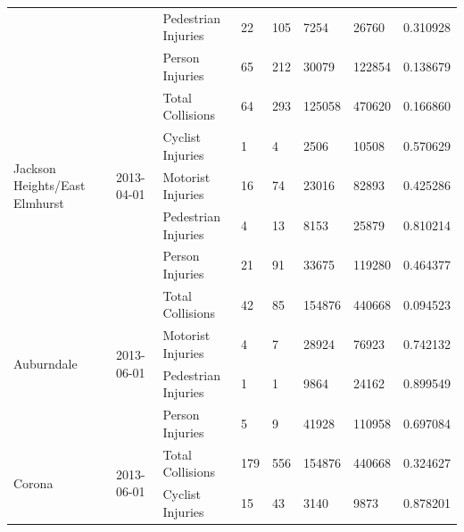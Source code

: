 \documentclass[10pt,journal,compsoc]{IEEEtran}
\begin{document}
\begin{table}[]
\begin{tabular}{|l|l|l|l|l|l|l|l|}
                                               &                             & Pedestrian Injuries & 22        & 105      & 7254       & 26760     & 0.310928 \\ \cline{3-8} 
                                               &                             & Person Injuries     & 65        & 212      & 30079      & 122854    & 0.138679 \\ \hline
\multirow{5}{*}{Jackson Heights/East Elmhurst} & \multirow{5}{*}{2013-04-01} & Total Collisions    & 64        & 293      & 125058     & 470620    & 0.166860 \\ \cline{3-8} 
                                               &                             & Cyclist Injuries    & 1         & 4        & 2506       & 10508     & 0.570629 \\ \cline{3-8} 
                                               &                             & Motorist Injuries   & 16        & 74       & 23016      & 82893     & 0.425286 \\ \cline{3-8} 
                                               &                             & Pedestrian Injuries & 4         & 13       & 8153       & 25879     & 0.810214 \\ \cline{3-8} 
                                               &                             & Person Injuries     & 21        & 91       & 33675      & 119280    & 0.464377 \\ \hline
\multirow{4}{*}{Auburndale}                    & \multirow{4}{*}{2013-06-01} & Total Collisions    & 42        & 85       & 154876     & 440668    & 0.094523 \\ \cline{3-8} 
                                               &                             & Motorist Injuries   & 4         & 7        & 28924      & 76923     & 0.742132 \\ \cline{3-8} 
                                               &                             & Pedestrian Injuries & 1         & 1        & 9864       & 24162     & 0.899549 \\ \cline{3-8} 
                                               &                             & Person Injuries     & 5         & 9        & 41928      & 110958    & 0.697084 \\ \hline
\multirow{5}{*}{Corona}                        & \multirow{5}{*}{2013-06-01} & Total Collisions    & 179       & 556      & 154876     & 440668    & 0.324627 \\ \cline{3-8} 
                                               &                             & Cyclist Injuries    & 15        & 43       & 3140       & 9873      & 0.878201 \\ \cline{3-8} 

\end{tabular}
\end{table}
\end{document}
